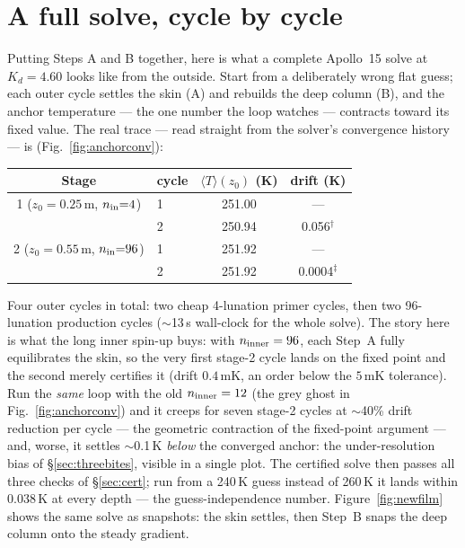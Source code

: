 \documentclass[11pt]{report}
\newcommand{\Tm}{\langle T\rangle}
\begin{document}
\section{A full solve, cycle by cycle}\label{sec:fullsolve}

Putting Steps A and B together, here is what a complete Apollo~15 solve at
$K_d=4.60$ looks like from the outside. Start from a deliberately wrong flat
guess; each outer cycle settles the skin (A) and rebuilds the deep column (B),
and the anchor temperature --- the one number the loop watches --- contracts
toward its fixed value. The real trace --- read straight from the solver's
convergence history --- is (Fig.~\ref{fig:anchorconv}):

\begin{center}\small
\begin{tabular}{@{}clcc@{}}
\toprule
Stage & cycle & $\Tm(z_0)$ (K) & drift (K) \\
\midrule
1 ($z_0{=}0.25$\,m, $n_{\rm in}{=}4$)  & 1 & 251.00 & --- \\
                                       & 2 & 250.94 & 0.056$^{\dagger}$ \\
\midrule
2 ($z_0{=}0.55$\,m, $n_{\rm in}{=}96$) & 1 & 251.92 & --- \\
                                       & 2 & 251.92 & 0.0004$^{\ddagger}$ \\
\bottomrule
\end{tabular}
\end{center}

\smallskip
\noindent Four outer cycles in total: two cheap 4-lunation primer cycles, then
two 96-lunation production cycles ($\sim$13\,s wall-clock for the whole solve).
The story here is what the long inner spin-up buys: with $n_{\rm inner}=96$,
each Step~A fully equilibrates the skin, so the very first stage-2 cycle lands
on the fixed point and the second merely certifies it (drift $0.4$\,mK, an
order below the $5$\,mK tolerance). Run the \emph{same} loop with the old
$n_{\rm inner}=12$ (the grey ghost in Fig.~\ref{fig:anchorconv}) and it creeps
for seven stage-2 cycles at $\sim$40\% drift reduction per cycle --- the
geometric contraction of the fixed-point argument --- and, worse, it settles
$\sim$0.1\,K \emph{below} the converged anchor: the under-resolution bias of
\S\ref{sec:threebites}, visible in a single plot. The certified solve then
passes all three checks of \S\ref{sec:cert}; run from a 240\,K guess instead of
260\,K it lands within $0.038$\,K at every depth --- the guess-independence
number. Figure~\ref{fig:newfilm} shows the same solve as snapshots: the skin
settles, then Step~B snaps the deep column onto the steady gradient.
\end{document}

